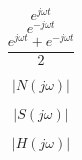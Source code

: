 \documentclass[letterpaper 12pt]{book}
\begin{document}
\[ e^{j \omega t} \]
\[ e^{-j \omega t } \]
\[ \frac{e^{j \omega t} + e^{-j \omega t}}{2} \]

\[ |N(j\omega)| \]

\[ |S(j\omega)| \]

\[ |H(j\omega)| \]
\end{document}
